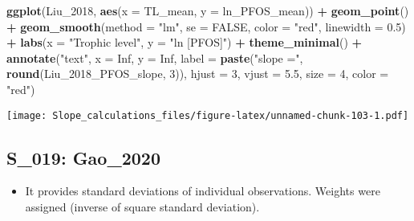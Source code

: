 \documentclass[
]{article}
\newenvironment{Shaded}{\begin{snugshade}}{\end{snugshade}}
\newcommand{\AttributeTok}[1]{\textcolor[rgb]{0.13,0.29,0.53}{#1}}
\newcommand{\ConstantTok}[1]{\textcolor[rgb]{0.56,0.35,0.01}{#1}}
\newcommand{\DecValTok}[1]{\textcolor[rgb]{0.00,0.00,0.81}{#1}}
\newcommand{\FloatTok}[1]{\textcolor[rgb]{0.00,0.00,0.81}{#1}}
\newcommand{\FunctionTok}[1]{\textcolor[rgb]{0.13,0.29,0.53}{\textbf{#1}}}
\newcommand{\NormalTok}[1]{#1}
\newcommand{\SpecialCharTok}[1]{\textcolor[rgb]{0.81,0.36,0.00}{\textbf{#1}}}
\newcommand{\StringTok}[1]{\textcolor[rgb]{0.31,0.60,0.02}{#1}}
\providecommand{\tightlist}{%
  \setlength{\itemsep}{0pt}\setlength{\parskip}{0pt}}
\begin{document}
\begin{Shaded}
\begin{Highlighting}[]
\FunctionTok{ggplot}\NormalTok{(Liu\_2018, }\FunctionTok{aes}\NormalTok{(}\AttributeTok{x =}\NormalTok{ TL\_mean, }\AttributeTok{y =}\NormalTok{ ln\_PFOS\_mean)) }\SpecialCharTok{+}
  \FunctionTok{geom\_point}\NormalTok{() }\SpecialCharTok{+}
  \FunctionTok{geom\_smooth}\NormalTok{(}\AttributeTok{method =} \StringTok{"lm"}\NormalTok{, }\AttributeTok{se =} \ConstantTok{FALSE}\NormalTok{, }\AttributeTok{color =} \StringTok{"red"}\NormalTok{, }\AttributeTok{linewidth =} \FloatTok{0.5}\NormalTok{) }\SpecialCharTok{+}
  \FunctionTok{labs}\NormalTok{(}\AttributeTok{x =} \StringTok{"Trophic level"}\NormalTok{,}
       \AttributeTok{y =} \StringTok{"ln [PFOS]"}\NormalTok{) }\SpecialCharTok{+}
  \FunctionTok{theme\_minimal}\NormalTok{() }\SpecialCharTok{+}
  \FunctionTok{annotate}\NormalTok{(}\StringTok{"text"}\NormalTok{, }\AttributeTok{x =} \ConstantTok{Inf}\NormalTok{, }\AttributeTok{y =} \ConstantTok{Inf}\NormalTok{, }\AttributeTok{label =} \FunctionTok{paste}\NormalTok{(}\StringTok{"slope ="}\NormalTok{, }\FunctionTok{round}\NormalTok{(Liu\_2018\_PFOS\_slope, }\DecValTok{3}\NormalTok{)), }
           \AttributeTok{hjust =} \DecValTok{3}\NormalTok{, }\AttributeTok{vjust =} \FloatTok{5.5}\NormalTok{, }\AttributeTok{size =} \DecValTok{4}\NormalTok{, }\AttributeTok{color =} \StringTok{"red"}\NormalTok{)}
\end{Highlighting}
\end{Shaded}

\texttt{[image: Slope\_calculations\_files/figure-latex/unnamed-chunk-103-1.pdf]}

\subsection{S\_019: Gao\_2020}\label{s_019-gao_2020-1}

\begin{itemize}
\tightlist
\item
  It provides standard deviations of individual observations. Weights
  were assigned (inverse of square standard deviation).
\end{itemize}
\end{document}
